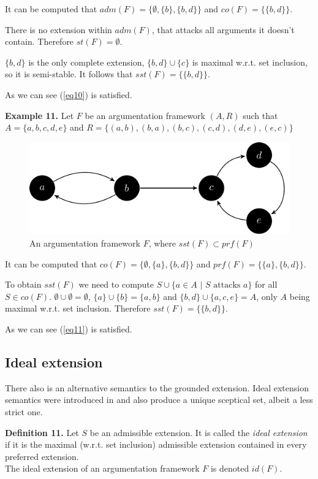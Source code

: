 \documentclass[draft,final]{vutinfth} %
\newcommand{\hl}{\par\vspace{6pt}} %
\newcommand{\cl}{\par\vspace{12pt}} %
\begin{document}
It can be computed that $adm(F)=\{\emptyset,\{b\},\{b,d\}\}$ and $co(F)=\{\{b,d\}\}$.\hl
There is no extension within $adm(F)$, that attacks all arguments it doesn't contain. Therefore $st(F)=\emptyset$.\hl
$\{b,d\}$ is the only complete extension, $\{b,d\}\cup \{c\}$ is maximal w.r.t. set inclusion, so it is semi-stable. It follows that $sst(F)=\{\{b,d\}\}$.\hl
As we can see (\ref{eq10}) is satisfied.\cl

\textbf{Example 11.} Let $F$ be an argumentation framework $(A,R)$ such that $A=\{a,b,c,d,e\}$ and $R=\{(a,b),(b,a),(b,c),(c,d),(d,e),(e,c)\}$\hl

\FloatBarrier
	\begin{figure}[!h]
		\centering
		\includegraphics[width=\linewidth]{graphs/ex5.pdf}
		\caption{An argumentation framework $F$, where $sst(F)\subset prf(F)$}
	\end{figure}
\FloatBarrier

It can be computed that $co(F)=\{\emptyset,\{a\},\{b,d\}\}$ and $prf(F)=\{\{a\},\{b,d\}\}$.\hl
To obtain $sst(F)$ we need to compute $S\cup\{a\in A\text{ | } S\text{ attacks }a\}$ for all $S\in co(F)$. $\emptyset\cup\emptyset=\emptyset$, $\{a\}\cup\{b\}=\{a,b\}$ and $\{b,d\}\cup\{a,c,e\}=A$, only $A$ being maximal w.r.t. set inclusion. Therefore $sst(F)=\{\{b,d\}\}$.\hl
As we can see (\ref{eq11}) is satisfied.\cl

\subsection{Ideal extension}
There also is an alternative semantics to the grounded extension. Ideal extension semantics were introduced in \cite{Alferes} and also produce a unique sceptical set, albeit a less strict one.\hl

\textbf{Definition 11.} Let $S$ be an admissible extension. It is called the \emph{ideal extension} if it is the maximal (w.r.t. set inclusion) admissible extension contained in every preferred extension.\\
The ideal extension of an argumentation framework $F$ is denoted $id(F)$.\hl
\end{document}
